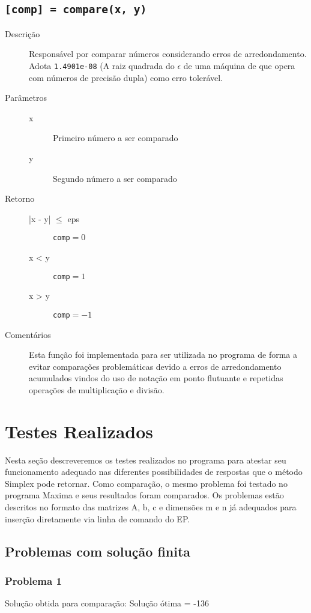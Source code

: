 \documentclass[brazil,times]{abnt}
\begin{document}
\subsection*{\texttt{[comp] = compare(x, y)}}
\begin{description}
	\item[Descrição] Responsável por comparar números considerando erros de arredondamento. Adota \texttt{1.4901e-08} (A raiz quadrada do $\epsilon$ de uma máquina de que opera com números de precisão dupla) como erro tolerável.
	\item[Parâmetros] 
		\begin{description}
		 \item[x] Primeiro número a ser comparado
		 \item[y] Segundo número a ser comparado
		\end{description}
	\item[Retorno]
		\begin{description}
		 \item[|x - y| $\leq$ eps] \texttt{comp}$ = 0$
		 \item[x < y] \texttt{comp}$ = 1$
		 \item[x > y] \texttt{comp}$ = -1$
		\end{description}
	\item[Comentários] Esta função foi implementada para ser utilizada no programa de forma a evitar comparações problemáticas devido a erros de arredondamento acumulados vindos do uso de notação em ponto flutuante e repetidas operações de multiplicação e divisão.
\end{description}

\section*{Testes Realizados}
Nesta seção descreveremos os testes realizados no programa para atestar seu funcionamento adequado nas diferentes possibilidades de respostas que o método Simplex pode retornar. Como comparação, o mesmo problema foi testado no programa Maxima \cite{maxima} e seus resultados foram comparados. Os problemas estão descritos no formato das matrizes A, b, c e dimensões m e n já adequados para inserção diretamente via linha de comando do EP.

\subsection*{Problemas com solução finita}
\subsubsection*{Problema 1}
Solução obtida para comparação: Solução ótima = -136
\end{document}
